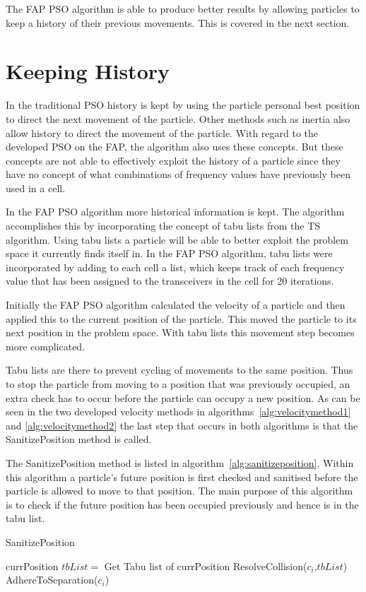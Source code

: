 The \gls{FAP} \gls{PSO} algorithm is able to produce better results by allowing particles to keep a history of their previous movements. This is covered in the next section.
\section{Keeping History}
\label{sec:keepinghistory}
In the traditional \gls{PSO} history is kept by using the particle personal best position to direct the next movement of the particle. Other methods such as inertia also allow history to direct the movement of the particle. With regard to the developed \gls{PSO} on the \gls{FAP}, the algorithm also uses these concepts. But these concepts are not able to effectively exploit the history of a particle since they have no concept of what combinations of frequency values have previously been used in a cell.

In the \gls{FAP} \gls{PSO} algorithm more historical information is kept. The algorithm accomplishes this by incorporating the concept of tabu lists from the \gls{TS} algorithm. Using tabu lists a particle will be able to better exploit the problem space it currently finds itself in. In the \gls{FAP} \gls{PSO} algorithm, tabu lists were incorporated by adding to each cell a list, which keeps track of each frequency value that has been assigned to the transceivers in the cell for 20 iterations.

Initially the \gls{FAP} \gls{PSO} algorithm calculated the velocity of a particle and then applied this to the current position of the particle. This moved the particle to its next position in the problem space. With tabu lists this movement step becomes more complicated.

Tabu lists are there to prevent cycling of movements to the same position. Thus to stop the particle from moving to a position that was previously occupied, an extra check has to occur before the particle can occupy a new position. As can be seen in the two developed velocity methods in algorithms~\ref{alg:velocitymethod1} and \ref{alg:velocitymethod2} the last step that occurs in both algorithms is that the SanitizePosition method is called.


The SanitizePosition method is listed in algorithm~\ref{alg:sanitizeposition}. Within this algorithm a particle's future position is first checked and sanitised before the particle is allowed to move to that position. The main purpose of this algorithm is to check if the future position has been occupied previously and hence is in the tabu list.
\begin{algorithm}[H]
\caption{SanitizePosition}
\label{alg:sanitizeposition}
\begin{algorithmic}[1]
	\Require currPosition
		\State $tbList = $ Get Tabu list of currPosition
		\State ResolveCollision($c_i$,$tbList$)
		\State AdhereToSeparation($c_i$)
	\EndFor
\end{algorithmic}
\end{algorithm}


